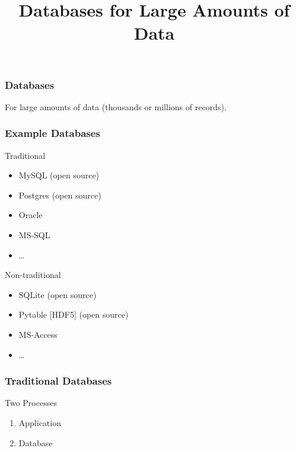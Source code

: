 
\title{Databases for Large Amounts of Data}

\frame{\maketitle}

\begin{frame}[fragile]
\frametitle{Databases}

For large amounts of data (thousands or millions of records).

\end{frame}

\begin{frame}[fragile]
\frametitle{Example Databases}

\begin{block}{Traditional}

\begin{itemize}
\item MySQL (open source)
\item Postgres (open source)
\item Oracle
\item MS-SQL
\item \ldots
\end{itemize}
\end{block}

\begin{block}{Non-traditional}
\begin{itemize}
\item SQLite (open source)
\item Pytable [HDF5] (open source)
\item MS-Access
\item \ldots
\end{itemize}
\end{block}
\end{frame}

\begin{frame}[fragile]
\frametitle{Traditional Databases}

\begin{block}{Two Processes}
\begin{enumerate}
\item Application
\item Database
\end{enumerate}
\end{block}

\end{frame}

